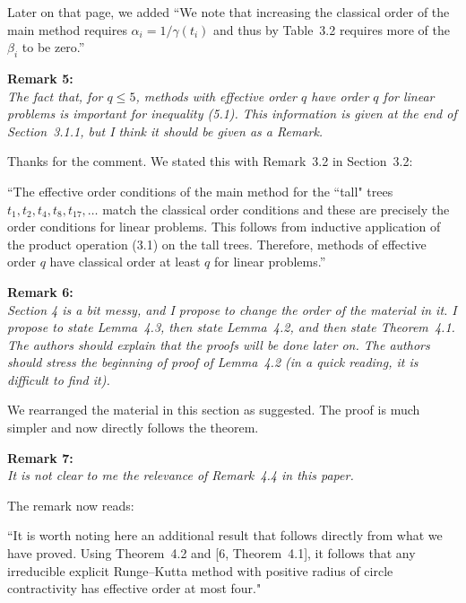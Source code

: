 \documentclass[12pt]{article}
\newcommand{\remark}[2]{\vspace{25pt} \noindent \textbf{Remark #1:\newline} \textit{#2}\vspace{15pt}}
\renewcommand{\newline}{\vspace{15pt}\\}
\newcommand{\david}[1]{\textcolor{red}{\\\textbf{D: \footnotesize #1}\\}}
\begin{document}
Later on that page, we added
``We note that increasing the classical order of the main method requires 
$\alpha_i = 1/\gamma(t_i)$ and
thus by Table~3.2 requires more of the $\beta_i$ to be zero.''

\pagebreak

\remark{5}{
The fact that, for $q \leq 5$, methods with effective order $q$ have order $q$ 
for linear problems is important for inequality (5.1). 
This information is given at the end of Section~3.1.1, but I think it should be given as a Remark.}

Thanks for the comment. We stated this with Remark~3.2 in Section~3.2:

``The effective order conditions of the main method for the ``tall" trees 
$t_1, t_2, t_4, t_8, t_{17}, \dots$ match the classical order conditions
and these are precisely the order conditions for linear problems.
This follows from inductive application of the product operation (3.1)
on the tall trees. 
Therefore, methods of effective order $q$ have classical order at least $q$ 
for linear problems.''


\remark{6}{
Section 4 is a bit messy, and I propose to change the order of the material in it. 
I propose to state Lemma~4.3, then state Lemma~4.2, and then state Theorem~4.1. 
The authors should explain that the proofs will be done later on. 
The authors should stress the beginning of proof of Lemma~4.2 (in a quick reading, 
it is difficult to find it).}

We rearranged the material in this section as suggested.  The proof is
much simpler and now directly follows the theorem.


\remark{7}{
It is not clear to me the relevance of Remark~4.4 in this paper.}

The remark now reads:

``It is worth noting here an additional result that 
follows directly from what we have proved.
Using Theorem~4.2 and [6, Theorem~4.1], 
it follows that any irreducible explicit Runge--Kutta method with positive radius of
circle contractivity has effective order at most four."

\pagebreak
\end{document}
